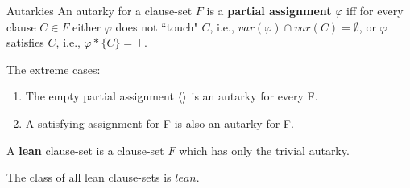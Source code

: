 \documentclass[xcolor=table	]{beamer}
\DeclarePairedDelimiter\ev{\langle}{\rangle}%
\begin{document}
%
% 
% 
%
% 

\begin{frame}{Autarkies}
An autarky for a clause-set $F$ is a \textbf{partial assignment} $\varphi$ iff for every clause $C \in F$ either $\varphi$ does not ``touch" $C$, i.e., $var(\varphi) \cap var(C) = \emptyset$, \newline or $\varphi$ satisfies $C$, i.e., $\varphi \ast \{C\} = \top$.\newline

%

\end{frame}

\begin{frame}{}
The extreme cases:
\begin{enumerate}
	\item The empty partial assignment $\ev{}$ is an autarky for every F.
	
	\item A satisfying assignment for F is also an autarky for F. \newline
\end{enumerate}

A \textbf{lean} clause-set is a clause-set $F$ which has
only the trivial autarky. \newline 

The class of all lean clause-sets is $lean$.

\end{frame}
\end{document}
